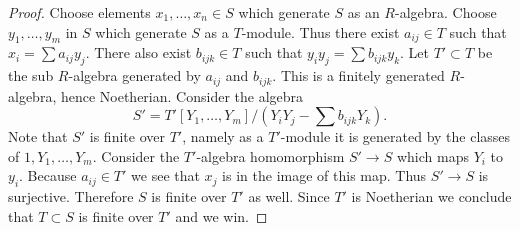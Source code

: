 \begin{proof}
Choose elements $x_1, \ldots, x_n \in S$ which generate $S$ as an $R$-algebra.
Choose $y_1, \ldots, y_m$ in $S$ which generate $S$ as a $T$-module.
Thus there exist $a_{ij} \in T$ such that
$x_i = \sum a_{ij} y_j$. There also exist $b_{ijk} \in T$ such
that $y_i y_j = \sum b_{ijk} y_k$. Let $T' \subset T$ be the
sub $R$-algebra generated by $a_{ij}$ and $b_{ijk}$. This is a finitely
generated $R$-algebra, hence Noetherian. Consider the algebra
$$
S' = T'[Y_1, \ldots, Y_m]/(Y_i Y_j - \sum b_{ijk} Y_k).
$$
Note that $S'$ is finite over $T'$, namely as a $T'$-module it is
generated by the classes of $1, Y_1, \ldots, Y_m$.
Consider the $T'$-algebra homomorphism $S' \to S$ which maps
$Y_i$ to $y_i$. Because $a_{ij} \in T'$ we see that $x_j$ is
in the image of this map. Thus $S' \to S$ is surjective.
Therefore $S$ is finite over $T'$ as well. Since $T'$ is Noetherian
we conclude that $T \subset S$ is finite over $T'$ and
we win.
\end{proof}






















